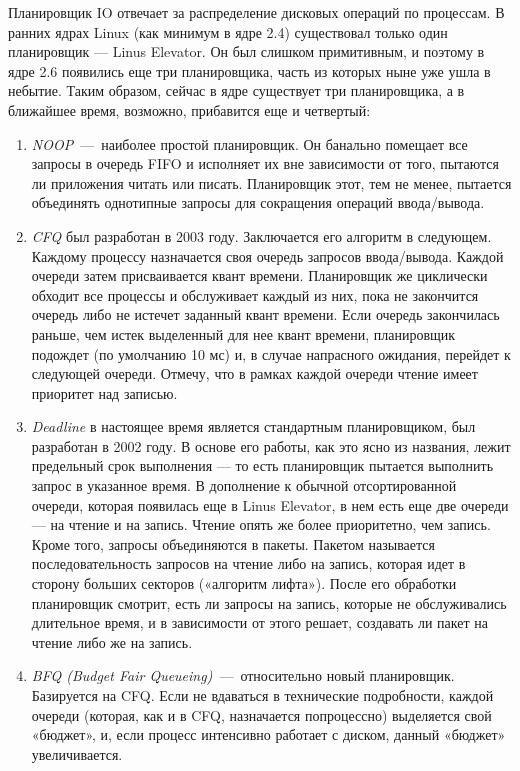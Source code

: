 Планировщик IO отвечает за распределение дисковых операций по процессам.  В ранних ядрах Linux (как минимум в ядре 2.4) существовал только один планировщик — Linus Elevator. Он был слишком примитивным, и поэтому в ядре 2.6 появились еще три планировщика, часть из которых ныне уже ушла в небытие. Таким образом, сейчас в ядре существует три планировщика, а в ближайшее время, возможно, прибавится еще и четвертый:
\begin{enumerate}
	\item \emph{NOOP}~---~наиболее простой планировщик. Он банально помещает все запросы в очередь FIFO и исполняет их вне зависимости от того, пытаются ли приложения читать или писать. Планировщик этот, тем не менее, пытается объединять однотипные запросы для сокращения операций ввода/вывода.
	\item \emph{CFQ} был разработан в 2003 году. Заключается его алгоритм в следующем. Каждому процессу назначается своя очередь запросов ввода/вывода. Каждой очереди затем присваивается квант времени. Планировщик же циклически обходит все процессы и обслуживает каждый из них, пока не закончится очередь либо не истечет заданный квант времени. Если очередь закончилась раньше, чем истек выделенный для нее квант времени, планировщик подождет (по умолчанию 10 мс) и, в случае напрасного ожидания, перейдет к следующей очереди. Отмечу, что в рамках каждой очереди чтение имеет приоритет над записью.
	\item \emph{Deadline} в настоящее время является стандартным планировщиком, был разработан в 2002 году. В основе его работы, как это ясно из названия, лежит предельный срок выполнения — то есть планировщик пытается выполнить запрос в указанное время. В дополнение к обычной отсортированной очереди, которая появилась еще в Linus Elevator, в нем есть еще две очереди — на чтение и на запись. Чтение опять же более приоритетно, чем запись. Кроме того, запросы объединяются в пакеты. Пакетом называется последовательность запросов на чтение либо на запись, которая идет в сторону больших секторов («алгоритм лифта»). После его обработки планировщик смотрит, есть ли запросы на запись, которые не обслуживались длительное время, и в зависимости от этого решает, создавать ли пакет на чтение либо же на запись.
	\item \emph{BFQ (Budget Fair Queueing)}~---~относительно новый планировщик. Базируется на CFQ. Если не вдаваться в технические подробности, каждой очереди (которая, как и в CFQ, назначается попроцессно) выделяется свой «бюджет», и, если процесс интенсивно работает с диском, данный «бюджет» увеличивается.
\end{enumerate}